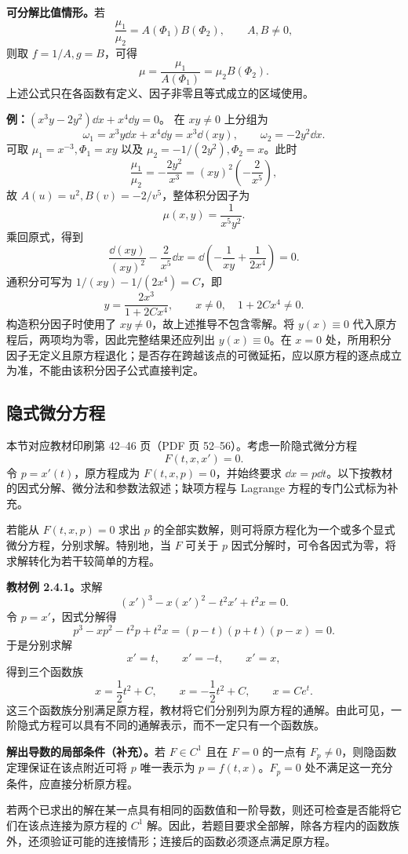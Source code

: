 \textbf{可分解比值情形。}若
\[
\frac{\mu_1}{\mu_2}=A(\Phi_1)B(\Phi_2),\qquad A,B\ne0,
\]
则取 $f=1/A,g=B$，可得
\[
\boxed{\mu=\frac{\mu_1}{A(\Phi_1)}=\mu_2B(\Phi_2).}
\]
上述公式只在各函数有定义、因子非零且等式成立的区域使用。

\textbf{例：}$ (x^3y-2y^2)\dd x+x^4\dd y=0$。
在 $xy\ne0$ 上分组为
\[
\omega_1=x^3y\dd x+x^4\dd y=x^3\dd(xy),\qquad
\omega_2=-2y^2\dd x.
\]
可取 $\mu_1=x^{-3},\Phi_1=xy$ 以及 $\mu_2=-1/(2y^2),\Phi_2=x$。此时
\[
\frac{\mu_1}{\mu_2}=-\frac{2y^2}{x^3}
=(xy)^2\left(-\frac2{x^5}\right),
\]
故 $A(u)=u^2,B(v)=-2/v^5$，整体积分因子为
\[
\boxed{\mu(x,y)=\frac1{x^5y^2}.}
\]
乘回原式，得到
\[
\frac{\dd(xy)}{(xy)^2}-\frac2{x^5}\dd x
=\dd\!\left(-\frac1{xy}+\frac1{2x^4}\right)=0.
\]
通积分可写为 $1/(xy)-1/(2x^4)=C$，即
\[
y=\frac{2x^3}{1+2Cx^4},\qquad x\ne0,\quad 1+2Cx^4\ne0.
\]
构造积分因子时使用了 $xy\ne0$，故上述推导不包含零解。将 $y(x)\equiv0$ 代入原方程后，两项均为零，因此完整结果还应列出 $y(x)\equiv0$。在 $x=0$ 处，所用积分因子无定义且原方程退化；是否存在跨越该点的可微延拓，应以原方程的逐点成立为准，不能由该积分因子公式直接判定。

\subsection{隐式微分方程}
本节对应教材印刷第 42--46 页（PDF 页 52--56）。考虑一阶隐式微分方程
\[
F(t,x,x')=0.
\]
令 $p=x'(t)$，原方程成为 $F(t,x,p)=0$，并始终要求 $\dd x=p\dd t$。以下按教材的因式分解、微分法和参数法叙述；缺项方程与 Lagrange 方程的专门公式标为补充。

若能从 $F(t,x,p)=0$ 求出 $p$ 的全部实数解，则可将原方程化为一个或多个显式微分方程，分别求解。特别地，当 $F$ 可关于 $p$ 因式分解时，可令各因式为零，将求解转化为若干较简单的方程。

\textbf{教材例 2.4.1。}求解
\[
(x')^3-x(x')^2-t^2x'+t^2x=0.
\]
令 $p=x'$，因式分解得
\[
p^3-xp^2-t^2p+t^2x=(p-t)(p+t)(p-x)=0.
\]
于是分别求解
\[
x'=t,\qquad x'=-t,\qquad x'=x,
\]
得到三个函数族
\[
\boxed{x=\frac12t^2+C,\qquad x=-\frac12t^2+C,\qquad x=Ce^t.}
\]
这三个函数族分别满足原方程，教材将它们分别列为原方程的通解。由此可见，一阶隐式方程可以具有不同的通解表示，而不一定只有一个函数族。

\textbf{解出导数的局部条件（补充）。}若 $F\in C^1$ 且在 $F=0$ 的一点有 $F_p\ne0$，则隐函数定理保证在该点附近可将 $p$ 唯一表示为 $p=f(t,x)$。$F_p=0$ 处不满足这一充分条件，应直接分析原方程。

若两个已求出的解在某一点具有相同的函数值和一阶导数，则还可检查是否能将它们在该点连接为原方程的 $C^1$ 解。因此，若题目要求全部解，除各方程内的函数族外，还须验证可能的连接情形；连接后的函数必须逐点满足原方程。


